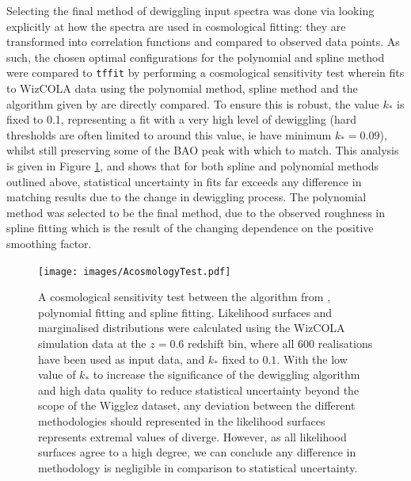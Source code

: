 \documentclass[titlesmallcaps, examinerscopy, copyrightpage]{uqthesis}
\begin{document}
\begin{appendices}
Selecting the final method of dewiggling input spectra was done via looking explicitly at how the spectra are used in cosmological fitting: they are transformed into correlation functions and compared to observed data points. As such, the chosen optimal configurations for the polynomial and spline method were compared to \verb;tffit; by performing a cosmological sensitivity test wherein fits to WizCOLA data using the polynomial method, spline method and the algorithm given by \citet{EisensteinHu1998} are directly compared. To ensure this is robust, the value $k_*$ is fixed to 0.1, representing a fit with a very high level of dewiggling (hard thresholds are often limited to around this value, ie \citet{ChuangWang2012} have minimum $k_* = 0.09$), whilst still preserving some of the BAO peak with which to match. This analysis is given in Figure \ref{fig:AcosmologyTest}, and shows that for both spline and polynomial methods outlined above, statistical uncertainty in fits far exceeds any difference in matching results due to the change in dewiggling process. The polynomial method was selected to be the final method, due to the observed roughness in spline fitting which is the result of the changing dependence on the positive smoothing factor.


\begin{figure}[h!]
  \begin{center}
    \texttt{[image: images/AcosmologyTest.pdf]}
  \end{center}
  \caption{A cosmological sensitivity test between the algorithm from \citet{EisensteinHu1998}, polynomial fitting and spline fitting. Likelihood surfaces and marginalised distributions were calculated using the WizCOLA simulation data at the $z=0.6$ redshift bin, where all 600 realisations have been used as input data, and $k_*$ fixed to $0.1$. With the low value of $k_*$ to increase the significance of the dewiggling algorithm and high data quality to reduce statistical uncertainty beyond the scope of the Wigglez dataset, any deviation between the different methodologies should represented in the likelihood surfaces represents extremal values of diverge. However, as all likelihood surfaces agree to a high degree, we can conclude any difference in methodology is negligible in comparison to statistical uncertainty.}
  \label{fig:AcosmologyTest}
\end{figure}











\end{appendices}
\end{document}
